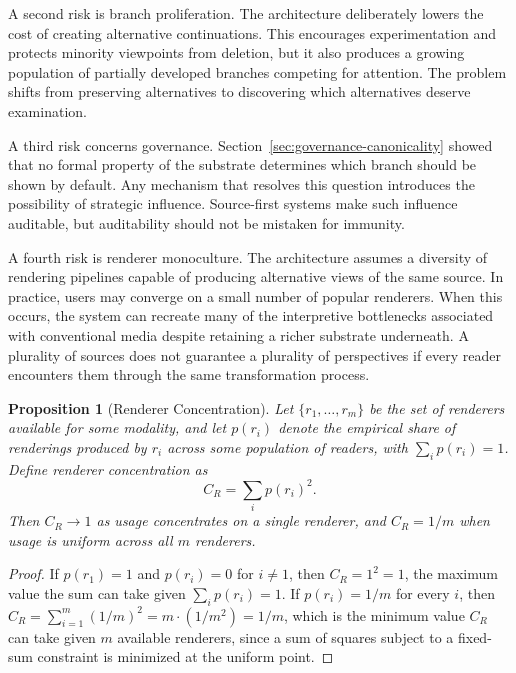 \documentclass[11pt]{article}
\newtheorem{proposition}[theorem]{Proposition}
\theoremstyle{definition}
\begin{document}
A second risk is branch proliferation. The architecture deliberately lowers the cost of creating alternative continuations. This encourages experimentation and protects minority viewpoints from deletion, but it also produces a growing population of partially developed branches competing for attention. The problem shifts from preserving alternatives to discovering which alternatives deserve examination.

A third risk concerns governance. Section~\ref{sec:governance-canonicality} showed that no formal property of the substrate determines which branch should be shown by default. Any mechanism that resolves this question introduces the possibility of strategic influence. Source-first systems make such influence auditable, but auditability should not be mistaken for immunity.

A fourth risk is renderer monoculture. The architecture assumes a diversity of rendering pipelines capable of producing alternative views of the same source. In practice, users may converge on a small number of popular renderers. When this occurs, the system can recreate many of the interpretive bottlenecks associated with conventional media despite retaining a richer substrate underneath. A plurality of sources does not guarantee a plurality of perspectives if every reader encounters them through the same transformation process.

\begin{proposition}[Renderer Concentration]
\label{prop:renderer-concentration}
Let $\{r_1, \dots, r_m\}$ be the set of renderers available for some modality, and let $p(r_i)$ denote the empirical share of renderings produced by $r_i$ across some population of readers, with $\sum_i p(r_i) = 1$. Define renderer concentration as
\[
C_R = \sum_i p(r_i)^2.
\]
Then $C_R \to 1$ as usage concentrates on a single renderer, and $C_R = 1/m$ when usage is uniform across all $m$ renderers.
\end{proposition}

\begin{proof}
If $p(r_1) = 1$ and $p(r_i) = 0$ for $i \neq 1$, then $C_R = 1^2 = 1$, the maximum value the sum can take given $\sum_i p(r_i) = 1$. If $p(r_i) = 1/m$ for every $i$, then $C_R = \sum_{i=1}^m (1/m)^2 = m \cdot (1/m^2) = 1/m$, which is the minimum value $C_R$ can take given $m$ available renderers, since a sum of squares subject to a fixed-sum constraint is minimized at the uniform point.
\end{proof}
\end{document}
